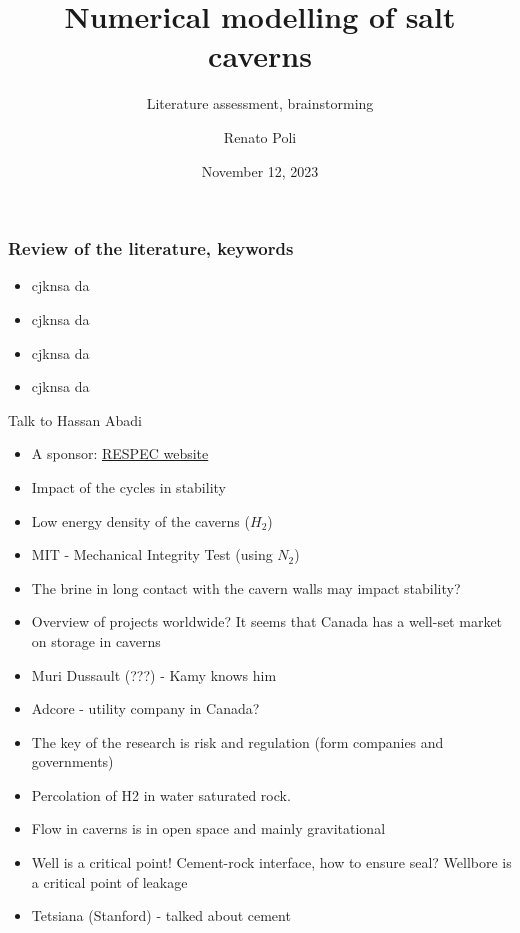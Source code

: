 




\title[Num modelling of salt caverns]{Numerical modelling of salt caverns}
\subtitle{Literature assessment, brainstorming}
\author[RPoli]{Renato Poli}
\date{November 12, 2023}



\maketitle

\begin{frame}
\frametitle{Review of the literature, keywords}
\begin{itemize}
\item cjknsa da
\item cjknsa da
\item cjknsa da
\item cjknsa da
\end{itemize}
\end{frame}

\begin{frame}{Talk to Hassan Abadi}
\begin{itemize}
\item A sponsor: \href{https://www.respec.com/market/energy/caverns-hydrogen-underground-storage/}{RESPEC website}
\item Impact of the cycles in stability
\item Low energy density of the caverns ($H_2$)
\item MIT - Mechanical Integrity Test (using $N_2$)
\item The brine in long contact with the cavern walls may impact stability?
\item Overview of projects worldwide? It seems that Canada has a well-set market on storage in caverns
\item Muri Dussault (???) - Kamy knows him
\item Adcore - utility company in Canada?
\item The key of the research is risk and regulation (form companies and governments)
\item Percolation of H2 in water saturated rock.
\item Flow in caverns is in open space and mainly gravitational
\item Well is a critical point! Cement-rock interface, how to ensure seal? Wellbore is a critical point of leakage
\item Tetsiana (Stanford) - talked about cement
\end{itemize}
\end{frame}

